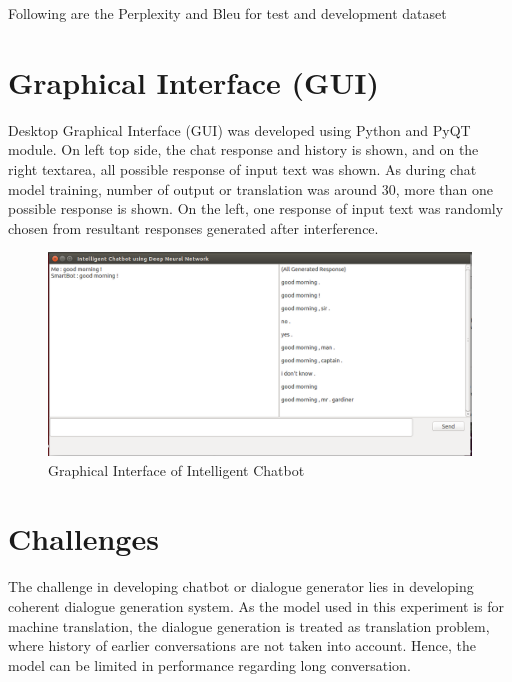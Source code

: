 \documentclass[a4paper,12pt]{report}
\begin{document}
Following are the Perplexity and Bleu for test and development dataset
\begin{center}
\begin{table}[H]
\begin{center}
\caption{Evaluation}
\bigskip
{}
\end{center}
\end{table}
\end{center}
{\let\clearpage\relax \chapter {Graphical Interface (GUI)}}
Desktop Graphical Interface (GUI) was developed using Python and PyQT module. On left top side, the chat response and history is shown, and on the right textarea, all possible response of input text was shown. As during chat model training, number of output or translation was around 30, more than one possible response is shown. On the left, one response of input text was randomly chosen from resultant responses generated after interference.   
\begin{figure}[H]
\begin{center}
\caption{Graphical Interface of Intelligent Chatbot}
\includegraphics[scale=.4]{chat_gui}
\end{center}
\end{figure}
{\let\clearpage\relax \chapter {Challenges}}
\noindent The challenge in developing chatbot or dialogue generator lies in developing coherent dialogue generation system. As the model used in this experiment is for machine translation, the dialogue generation is treated as translation problem, where history of earlier conversations are not taken into account. Hence, the model can be limited in performance regarding long conversation.\\\\
\end{document}
